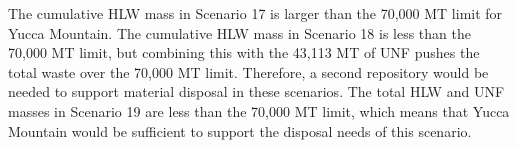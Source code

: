The cumulative \gls{HLW} mass in Scenario 17 is larger than the 70,000
MT limit for Yucca Mountain. The cumulative \gls{HLW} mass 
in Scenario 18 is less than the 70,000 MT limit, but combining this with 
the 43,113 MT of \gls{UNF} pushes the total waste over the 70,000 MT 
limit. Therefore, a second repository would be needed to support 
material disposal in these scenarios. The total \gls{HLW} and \gls{UNF} 
masses in Scenario 19 are less than the 70,000 MT limit, which means 
that Yucca Mountain would be sufficient to support the disposal 
needs of this scenario. 